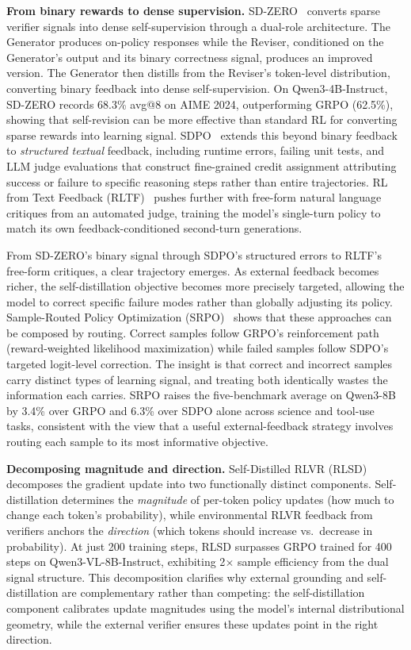 \documentclass{article} %
\begin{document}
\textbf{From binary rewards to dense supervision.} SD-ZERO~\citep{he2026selfdistillation} converts sparse verifier signals into dense self-supervision through a dual-role architecture. The Generator produces on-policy responses while the Reviser, conditioned on the Generator's output and its binary correctness signal, produces an improved version. The Generator then distills from the Reviser's token-level distribution, converting binary feedback into dense self-supervision. On Qwen3-4B-Instruct, SD-ZERO records 68.3\% avg@8 on AIME 2024, outperforming GRPO (62.5\%), showing that self-revision can be more effective than standard RL for converting sparse rewards into learning signal. SDPO~\citep{2601.20802} extends this beyond binary feedback to \emph{structured textual} feedback, including runtime errors, failing unit tests, and LLM judge evaluations that construct fine-grained credit assignment attributing success or failure to specific reasoning steps rather than entire trajectories. RL from Text Feedback (RLTF)~\citep{song2026expanding} pushes further with free-form natural language critiques from an automated judge, training the model's single-turn policy to match its own feedback-conditioned second-turn generations.

From SD-ZERO's binary signal through SDPO's structured errors to RLTF's free-form critiques, a clear trajectory emerges. As external feedback becomes richer, the self-distillation objective becomes more precisely targeted, allowing the model to correct specific failure modes rather than globally adjusting its policy. Sample-Routed Policy Optimization (SRPO)~\citep{li2026unifying} shows that these approaches can be composed by routing. Correct samples follow GRPO's reinforcement path (reward-weighted likelihood maximization) while failed samples follow SDPO's targeted logit-level correction. The insight is that correct and incorrect samples carry distinct types of learning signal, and treating both identically wastes the information each carries. SRPO raises the five-benchmark average on Qwen3-8B by 3.4\% over GRPO and 6.3\% over SDPO alone across science and tool-use tasks, consistent with the view that a useful external-feedback strategy involves routing each sample to its most informative objective.

\textbf{Decomposing magnitude and direction.} Self-Distilled RLVR (RLSD)~\citep{yang2026selfdistilled} decomposes the gradient update into two functionally distinct components. Self-distillation determines the \emph{magnitude} of per-token policy updates (how much to change each token's probability), while environmental RLVR feedback from verifiers anchors the \emph{direction} (which tokens should increase vs.\ decrease in probability). At just 200 training steps, RLSD surpasses GRPO trained for 400 steps on Qwen3-VL-8B-Instruct, exhibiting 2$\times$ sample efficiency from the dual signal structure. This decomposition clarifies why external grounding and self-distillation are complementary rather than competing: the self-distillation component calibrates update magnitudes using the model's internal distributional geometry, while the external verifier ensures these updates point in the right direction.
\end{document}
